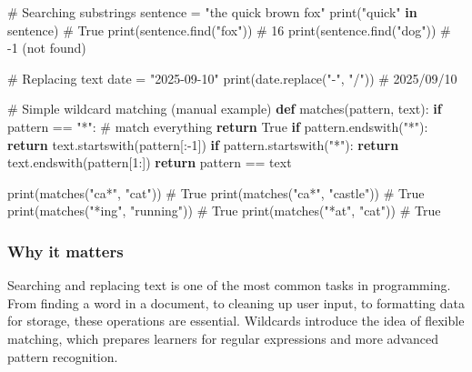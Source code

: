 \documentclass[
  letterpaper,
  DIV=11,
  numbers=noendperiod]{scrreprt}
\newenvironment{Shaded}{\begin{snugshade}}{\end{snugshade}}
\newcommand{\BuiltInTok}[1]{\textcolor[rgb]{0.00,0.23,0.31}{#1}}
\newcommand{\CommentTok}[1]{\textcolor[rgb]{0.37,0.37,0.37}{#1}}
\newcommand{\ControlFlowTok}[1]{\textcolor[rgb]{0.00,0.23,0.31}{\textbf{#1}}}
\newcommand{\DecValTok}[1]{\textcolor[rgb]{0.68,0.00,0.00}{#1}}
\newcommand{\KeywordTok}[1]{\textcolor[rgb]{0.00,0.23,0.31}{\textbf{#1}}}
\newcommand{\NormalTok}[1]{\textcolor[rgb]{0.00,0.23,0.31}{#1}}
\newcommand{\OperatorTok}[1]{\textcolor[rgb]{0.37,0.37,0.37}{#1}}
\newcommand{\StringTok}[1]{\textcolor[rgb]{0.13,0.47,0.30}{#1}}
\newcommand{\VariableTok}[1]{\textcolor[rgb]{0.07,0.07,0.07}{#1}}
\begin{document}
\begin{Shaded}
\begin{Highlighting}[]
\CommentTok{\# Searching substrings}
\NormalTok{sentence }\OperatorTok{=} \StringTok{"the quick brown fox"}
\BuiltInTok{print}\NormalTok{(}\StringTok{"quick"} \KeywordTok{in}\NormalTok{ sentence)       }\CommentTok{\# True}
\BuiltInTok{print}\NormalTok{(sentence.find(}\StringTok{"fox"}\NormalTok{))      }\CommentTok{\# 16}
\BuiltInTok{print}\NormalTok{(sentence.find(}\StringTok{"dog"}\NormalTok{))      }\CommentTok{\# {-}1 (not found)}

\CommentTok{\# Replacing text}
\NormalTok{date }\OperatorTok{=} \StringTok{"2025{-}09{-}10"}
\BuiltInTok{print}\NormalTok{(date.replace(}\StringTok{"{-}"}\NormalTok{, }\StringTok{"/"}\NormalTok{))    }\CommentTok{\# 2025/09/10}

\CommentTok{\# Simple wildcard matching (manual example)}
\KeywordTok{def}\NormalTok{ matches(pattern, text):}
    \ControlFlowTok{if}\NormalTok{ pattern }\OperatorTok{==} \StringTok{"*"}\NormalTok{:  }\CommentTok{\# match everything}
        \ControlFlowTok{return} \VariableTok{True}
    \ControlFlowTok{if}\NormalTok{ pattern.endswith(}\StringTok{"*"}\NormalTok{):}
        \ControlFlowTok{return}\NormalTok{ text.startswith(pattern[:}\OperatorTok{{-}}\DecValTok{1}\NormalTok{])}
    \ControlFlowTok{if}\NormalTok{ pattern.startswith(}\StringTok{"*"}\NormalTok{):}
        \ControlFlowTok{return}\NormalTok{ text.endswith(pattern[}\DecValTok{1}\NormalTok{:])}
    \ControlFlowTok{return}\NormalTok{ pattern }\OperatorTok{==}\NormalTok{ text}

\BuiltInTok{print}\NormalTok{(matches(}\StringTok{"ca*"}\NormalTok{, }\StringTok{"cat"}\NormalTok{))      }\CommentTok{\# True}
\BuiltInTok{print}\NormalTok{(matches(}\StringTok{"ca*"}\NormalTok{, }\StringTok{"castle"}\NormalTok{))   }\CommentTok{\# True}
\BuiltInTok{print}\NormalTok{(matches(}\StringTok{"*ing"}\NormalTok{, }\StringTok{"running"}\NormalTok{)) }\CommentTok{\# True}
\BuiltInTok{print}\NormalTok{(matches(}\StringTok{"*at"}\NormalTok{, }\StringTok{"cat"}\NormalTok{))      }\CommentTok{\# True}
\end{Highlighting}
\end{Shaded}

\subsubsection{Why it matters}\label{why-it-matters-39}

Searching and replacing text is one of the most common tasks in
programming. From finding a word in a document, to cleaning up user
input, to formatting data for storage, these operations are essential.
Wildcards introduce the idea of flexible matching, which prepares
learners for regular expressions and more advanced pattern recognition.
\end{document}
